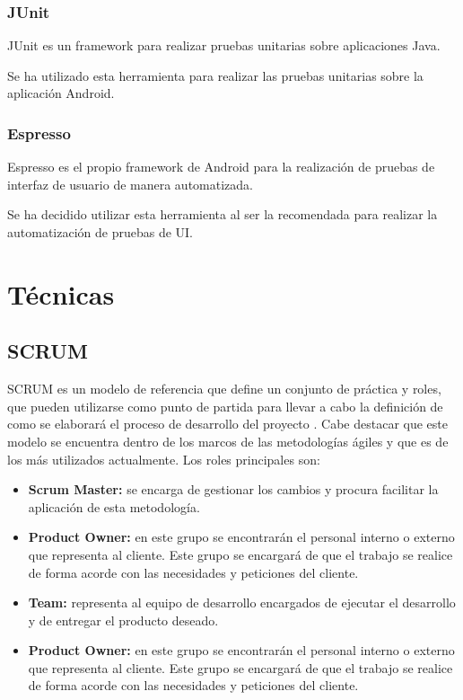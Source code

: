 \subsubsection{JUnit}

JUnit es un framework para realizar pruebas unitarias sobre aplicaciones Java. \cite{wiki:junit}

Se ha utilizado esta herramienta para realizar las pruebas unitarias sobre la aplicación Android.

\subsubsection{Espresso}

Espresso es el propio framework de Android para la realización de pruebas de interfaz de usuario de manera automatizada. \cite{wiki:espresso}

Se ha decidido utilizar esta herramienta al ser la recomendada para realizar la automatización de pruebas de UI.

\section{Técnicas}

\subsection{SCRUM}\label{scrum} 

SCRUM es un modelo de referencia que define un conjunto de práctica y roles, que pueden utilizarse como punto de partida para llevar a cabo la definición de como se elaborará el proceso de desarrollo del proyecto \cite{wiki:scrum}. Cabe destacar que este modelo se encuentra dentro de los marcos de las metodologías ágiles y que es de los más utilizados actualmente.
Los roles principales son:

\begin{itemize}

	\item \textbf{Scrum Master:} se encarga de gestionar los cambios y procura facilitar la aplicación de esta metodología.
	
	\item \textbf{Product Owner:} en este grupo se encontrarán el personal interno o externo que representa al cliente. Este grupo se encargará de que el trabajo se realice de forma acorde con las necesidades y peticiones del cliente.
	
	\item \textbf{Team:} representa al equipo de desarrollo encargados de ejecutar el desarrollo y de entregar el producto deseado.
	
	\item \textbf{Product Owner:} en este grupo se encontrarán el personal interno o externo que representa al cliente. Este grupo se encargará de que el trabajo se realice de forma acorde con las necesidades y peticiones del cliente.	

\end{itemize}
\cite{wiki:scrum}
 

